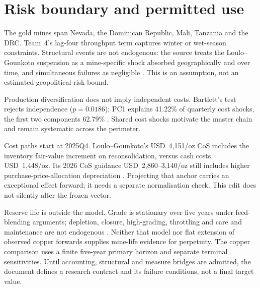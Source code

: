 \section{Risk boundary and permitted use}
\label{sec:company-risk-boundary}

The gold mines span Nevada, the Dominican Republic, Mali, Tanzania and the
DRC. Team~4's lag-four throughput term captures winter or wet-season
constraints. Structural events are not endogenous: the source treats the
Loulo--Gounkoto suspension as a mine-specific shock absorbed geographically
and over time, and simultaneous failures as negligible \cite{team4}.
This is an assumption, not an estimated geopolitical-risk bound.

Production diversification does not imply independent costs. Bartlett's test
rejects independence ($p=0.0186$); PC1 explains 41.22\% of quarterly cost
shocks, the first two components 62.79\% \cite{team4}. Shared cost shocks
motivate the master chain and remain systematic across the perimeter.

Cost paths start at 2025Q4. Loulo--Gounkoto's USD~4,151/oz CoS includes the
inventory fair-value increment on reconsolidation, versus cash costs
USD~1,448/oz. Its 2026 CoS guidance USD~2,860--3,140/oz still includes higher
purchase-price-allocation depreciation \cite{barrick-ar-2025}. Projecting
that anchor carries an exceptional effect forward; it needs a separate
normalisation check. This edit does not silently alter the frozen vector.

Reserve life is outside the model. Grade is stationary over five years under
feed-blending arguments; depletion, closure, high-grading, throttling and
care and maintenance are not endogenous \cite{team4}. Neither that model
nor flat extension of observed copper forwards supplies mine-life evidence
for perpetuity. The copper comparison uses a finite five-year primary
horizon and separate terminal sensitivities. Until accounting, structural
and measure bridges are admitted, the document defines a research contract
and its failure conditions, not a final target value.
